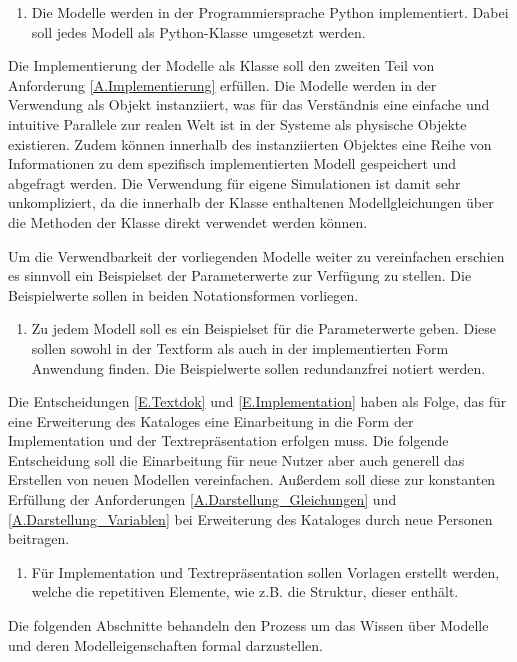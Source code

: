 \begin{enumerate}[resume*]
	\item \label{E.Implementation}Die Modelle werden in der Programmiersprache Python implementiert. Dabei soll jedes Modell als Python-Klasse umgesetzt werden.
\end{enumerate}
Die Implementierung der Modelle als Klasse soll den zweiten Teil von Anforderung \ref{A.Implementierung} erfüllen. Die Modelle werden in der Verwendung als Objekt instanziiert, was für das Verständnis eine einfache und intuitive Parallele zur realen Welt ist in der Systeme als physische Objekte existieren. Zudem können innerhalb des instanziierten Objektes eine Reihe von Informationen zu dem spezifisch implementierten Modell gespeichert und abgefragt werden. Die Verwendung für eigene Simulationen ist damit sehr unkompliziert, da die innerhalb der Klasse enthaltenen Modellgleichungen über die Methoden der Klasse direkt verwendet werden können.

Um die Verwendbarkeit der vorliegenden Modelle weiter zu vereinfachen erschien es sinnvoll ein Beispielset der Parameterwerte zur Verfügung zu stellen. Die Beispielwerte sollen in beiden Notationsformen vorliegen.
\begin{enumerate}[resume*]
	\item \label{E.Parameterwerte}Zu jedem Modell soll es ein Beispielset für die Parameterwerte geben. Diese sollen sowohl in der Textform als auch in der implementierten Form Anwendung finden. Die Beispielwerte sollen redundanzfrei notiert werden.
\end{enumerate}

Die Entscheidungen \ref{E.Textdok} und \ref{E.Implementation} haben als Folge, das für eine Erweiterung des Kataloges eine Einarbeitung in die Form der Implementation und der Textrepräsentation erfolgen muss. Die folgende Entscheidung soll die Einarbeitung für neue Nutzer aber auch generell das Erstellen von neuen Modellen vereinfachen. Außerdem soll diese zur konstanten Erfüllung der Anforderungen \ref{A.Darstellung_Gleichungen} und \ref{A.Darstellung_Variablen} bei Erweiterung des Kataloges durch neue Personen beitragen.
\begin{enumerate}[resume*]
	\item \label{E.Vorlagen}Für Implementation und Textrepräsentation sollen Vorlagen erstellt werden, welche die repetitiven Elemente, wie z.B. die Struktur, dieser enthält. 
\end{enumerate}

Die folgenden Abschnitte behandeln den Prozess um das Wissen über Modelle und deren Modelleigenschaften formal darzustellen.
